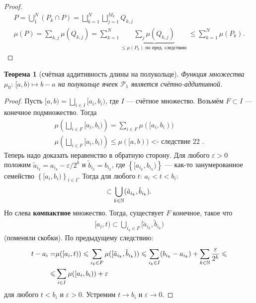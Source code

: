 \documentclass[a4paper,14pt]{extarticle}
\newcounter{theoremCnt}
\theoremstyle{definition}
\theoremstyle{plain}
\newtheorem{thm}[theoremCnt]{Теорема}
\theoremstyle{plain}
\theoremstyle{plain}
\theoremstyle{plain}
\theoremstyle{definition}
\theoremstyle{definition}
\theoremstyle{definition}
\theoremstyle{definition}
\theoremstyle{definition}
\theoremstyle{definition}
\theoremstyle{plain}
\theoremstyle{plain}
\theoremstyle{plain}
\theoremstyle{plain}
\theoremstyle{definition}
\theoremstyle{definition}
\theoremstyle{definition}
\theoremstyle{definition}
\theoremstyle{definition}
\newcommand{\N}{\ensuremath \mathbb{N}}
\begin{document}
\begin{proof}
 \begin{align*}
  P = \bigcup_1^N (P_k \cap P) = \bigsqcup_{k=1}^N \bigsqcup_{j=1}^{M_k} Q_{k,j} \\
  \mu(P) = \sum_{k,j}^{} \mu(Q_{k,j}) = \sum_{k=1}^{N} \underbrace{\sum_j \mu(Q_{k,j})}_{\leqslant \mu(P_k) \text{ по пред. следствию }} \leqslant \sum_{k=1}^{N} \mu(P_k)
  .\end{align*}
\end{proof}
\begin{thm}[счётная аддитивность длины на полукольце]
 Функция множества $ \mu_0 \colon\, [a, b) \mapsto b - a $ на полукольце ячеек $ \mathcal{P}_1 $ является счётно-аддитивной.
\end{thm}
\begin{proof}
 Пусть $ [a, b) = \bigsqcup_{i \in I} [a_i, b_i) $, где $ I $ --- счётное множество. Возьмём $ F \subset I $ --- конечное подмножество. Тогда
 \begin{align*}
  \mu\left( \bigsqcup_{i \in F} [a_i, b_i) \right) = \sum_{i \in F}^{} \mu( [a_i, b_i) ) \\
  \mu\left( \bigsqcup_{i \in F} [a_i, b_i) \right) \leqslant \mu([a, b)) \text { <- следствие 22 }
  .\end{align*} Теперь надо доказать неравенство в обратную сторону. Для любого $ \varepsilon > 0 $ положим $ \tilde a_{i_k} = a_{i_k} - \varepsilon/2^k $ и $ \tilde b_{i_k} = b_{i_k} $, где $ \left\{ [a_{i_k}, b_{i_k}) \right\}  $ --- как-то занумерованное семейство $ \left\{ [a_i, b_i) \right\}_{i \in I}  $. Тогда для любого $ t $: $ a_i < t < b_i $:
 \begin{align*}
  [a_i, t] \subset \bigcup_{k \in \N} (\tilde a_{i_k}, \tilde b_{i_k})
  .\end{align*} Но слева \textbf{компактное} множество. Тогда, существует $ F $ конечное, такое что
 \begin{align*}
  [a_i, t) \subset \bigcup_{i_k \in F} [\tilde a_{i_k}, \tilde b_{i_k})
 \end{align*} (поменяли скобки). По предыдущему следствию:
 \begin{align*}
  t - a_i = & \mu([a_i, t)) \leqslant \sum_{i_k \in F}^{} \mu([\tilde a_{i_k}, \tilde b_{i_k})) \leqslant \sum_{i_k \in I}^{} (b_{i_k} - a_{i_k}) + \sum_{k \in \N} \frac{\varepsilon}{2^k} \leqslant \\
  \leqslant & \sum_{i \in I} \mu([a_i, b_i)) + \varepsilon
 \end{align*} для любого $ t < b_i $ и $ \varepsilon > 0 $. Устремим $ t \to b_i $ и $ \varepsilon \to 0 $.
\end{proof}
\end{document}
